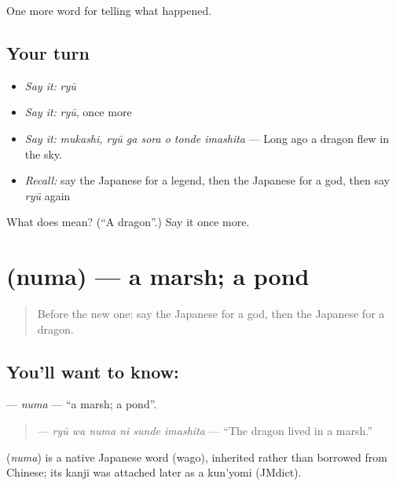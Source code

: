 \begin{grammarlens}[title={What you've built}]
One more word for telling what happened.
\end{grammarlens}

\subsection*{Your turn}
\begin{itemize}
\raggedright
  \item \emph{Say it:} \emph{ryū}
  \item \emph{Say it:} \emph{ryū}, once more
  \item \emph{Say it:} \emph{mukashi, ryū ga sora o tonde imashita} — Long ago a dragon flew in the sky.
  \item \emph{Recall:} say the Japanese for a legend, then the Japanese for a god, then say \emph{ryū} again
\end{itemize}

\begin{tcolorbox}[breakable,colback=teal!4,colframe=teal!35!black,title={Before you move on}]
What does  mean? (\textquotedblleft{}A dragon\textquotedblright{}.) Say it once more.
\end{tcolorbox}
\section[\texorpdfstring{\ja{ぬま} (numa)}{ぬま (numa)}]{ (numa) — a marsh; a pond}

\label{lesson:JA-C303-numa}



\begin{quote}
Before the new one: say the Japanese for a god, then the Japanese for a dragon.
\end{quote}

\subsection*{You'll want to know: }
\textbf{} — \emph{numa} — \textquotedblleft{}a marsh; a pond\textquotedblright{}.

\begin{quote}
\textbf{  } — \emph{ryū wa numa ni sunde imashita} — \textquotedblleft{}The dragon lived in a marsh.\textquotedblright{}
\end{quote}

\begin{cousinweb}
\textbf{} (\emph{numa}) is a native Japanese word (wago), inherited rather than borrowed from Chinese; its kanji was attached later as a kun'yomi (JMdict).
\end{cousinweb}

